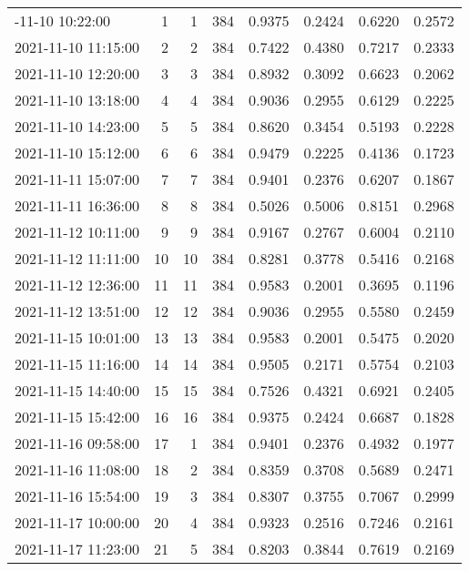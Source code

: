\begin{longtable}{lrrrrrrr}
\bottomrule
\endlastfoot
2021-11-10 10:22:00 &    1 &    1 &    384 &   0.9375 & 0.2424 & 0.6220 & 0.2572 \\
2021-11-10 11:15:00 &    2 &    2 &    384 &   0.7422 & 0.4380 & 0.7217 & 0.2333 \\
2021-11-10 12:20:00 &    3 &    3 &    384 &   0.8932 & 0.3092 & 0.6623 & 0.2062 \\
2021-11-10 13:18:00 &    4 &    4 &    384 &   0.9036 & 0.2955 & 0.6129 & 0.2225 \\
2021-11-10 14:23:00 &    5 &    5 &    384 &   0.8620 & 0.3454 & 0.5193 & 0.2228 \\
2021-11-10 15:12:00 &    6 &    6 &    384 &   0.9479 & 0.2225 & 0.4136 & 0.1723 \\
2021-11-11 15:07:00 &    7 &    7 &    384 &   0.9401 & 0.2376 & 0.6207 & 0.1867 \\
2021-11-11 16:36:00 &    8 &    8 &    384 &   0.5026 & 0.5006 & 0.8151 & 0.2968 \\
2021-11-12 10:11:00 &    9 &    9 &    384 &   0.9167 & 0.2767 & 0.6004 & 0.2110 \\
2021-11-12 11:11:00 &   10 &   10 &    384 &   0.8281 & 0.3778 & 0.5416 & 0.2168 \\
2021-11-12 12:36:00 &   11 &   11 &    384 &   0.9583 & 0.2001 & 0.3695 & 0.1196 \\
2021-11-12 13:51:00 &   12 &   12 &    384 &   0.9036 & 0.2955 & 0.5580 & 0.2459 \\
2021-11-15 10:01:00 &   13 &   13 &    384 &   0.9583 & 0.2001 & 0.5475 & 0.2020 \\
2021-11-15 11:16:00 &   14 &   14 &    384 &   0.9505 & 0.2171 & 0.5754 & 0.2103 \\
2021-11-15 14:40:00 &   15 &   15 &    384 &   0.7526 & 0.4321 & 0.6921 & 0.2405 \\
2021-11-15 15:42:00 &   16 &   16 &    384 &   0.9375 & 0.2424 & 0.6687 & 0.1828 \\
2021-11-16 09:58:00 &   17 &    1 &    384 &   0.9401 & 0.2376 & 0.4932 & 0.1977 \\
2021-11-16 11:08:00 &   18 &    2 &    384 &   0.8359 & 0.3708 & 0.5689 & 0.2471 \\
2021-11-16 15:54:00 &   19 &    3 &    384 &   0.8307 & 0.3755 & 0.7067 & 0.2999 \\
2021-11-17 10:00:00 &   20 &    4 &    384 &   0.9323 & 0.2516 & 0.7246 & 0.2161 \\
2021-11-17 11:23:00 &   21 &    5 &    384 &   0.8203 & 0.3844 & 0.7619 & 0.2169 \\

\end{longtable}
